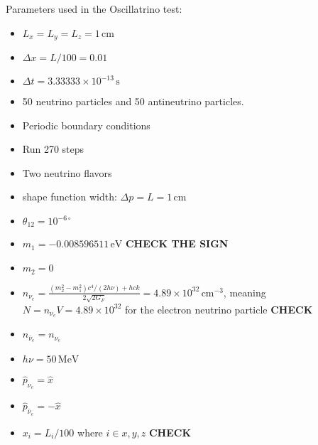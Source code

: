 \documentclass{article}
\begin{document}
Parameters used in the Oscillatrino test:
\begin{itemize}
\item $L_x=L_y=L_z=1\,\mathrm{cm}$
\item $\Delta x = L/100 = 0.01 $ 
\item $\Delta t = 3.33333 \times10^{-13}\,\mathrm{s}$
\item 50 neutrino particles and 50 antineutrino particles.
\item Periodic boundary conditions
\item Run 270 steps
\item Two neutrino flavors
\item shape function width: $\Delta p=L=1\,\mathrm{cm}$
\item $\theta_{12}=10^{-6 \circ}$
\item $m_1 = -0.008596511\,\mathrm{eV}$ \textbf{CHECK THE SIGN}
\item $m_2 = 0$
\item $n_{\nu_e}= \frac{(m_2^2 - m_1^2) c^4 / (2h\nu) + hck}{2\sqrt{2G_F}} = 4.89 \times 10^{32}\,\mathrm{cm}^{-3}$, meaning $N=n_{\nu_e}V=4.89 \times 10^{32}$ for the electron neutrino particle \textbf{CHECK}
\item $n_{\bar{\nu}_e} = n_{\nu_e}$
\item $h\nu=50\,\mathrm{MeV}$
\item $\hat{p}_{\nu_e} = \hat{x}$
\item $\hat{p}_{\bar{\nu}_e} = -\hat{x}$
\item $x_i = L_i/100$ where $i\in{x,y,z}$ \textbf{CHECK}
\end{itemize}
\end{document}
